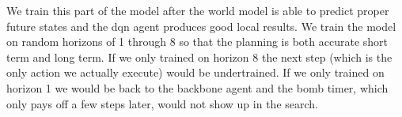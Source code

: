 \documentclass[article, 10pt]{IEEEtran}
\begin{document}
We train this part of the model after the world model is able to predict proper future states and the dqn agent produces good local results. We train the model on random horizons of 1 through 8 so that the planning is both accurate short term and long term. If we only trained on horizon 8 the next step (which is the only action we actually execute) would be undertrained. If we only trained on horizon 1 we would be back to the backbone agent and the bomb timer, which only pays off a few steps later, would not show up in the search. %











\end{document}
